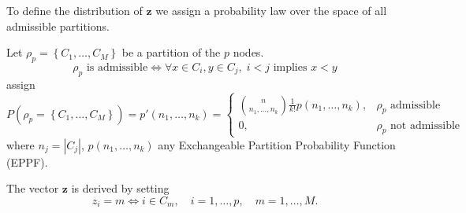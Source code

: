 \begin{frame}
To define the distribution of $\bm{z}$ we assign a probability law over the space of all \alert{admissible} partitions.

\pause

Let $\rho_p=\left\{C_1, \ldots, C_M\right\}$ be a partition of the $p$ nodes.
\[
    \rho_p \text{ is admissible} \iff \forall x \in C_i, y \in C_{j}, \; i<j \text{ implies } x < y
\]
\cite{martinezNonparametricChangePoint2014} assign
\begin{equation*}
    P\left(\rho_p=\left\{C_1, \ldots, C_M\right\}\right)
    =
    p'(n_1, \ldots, n_k)=
    \begin{cases}
        \binom{n}{n_1, \ldots, n_k} \frac{1}{k !} p(n_1, \ldots, n_k), & \rho_p \text{ admissible}\\
        0, & \rho_p \text{ not admissible}
    \end{cases}
\end{equation*}
where $n_j=\left|C_j\right|$, $p(n_1, \ldots, n_k)$ any Exchangeable Partition Probability Function (EPPF).

The vector $\bm{z}$ is derived by setting
\[
z_i=m \iff i \in C_m, \quad i=1, \ldots, p, \quad m=1, \ldots, M.
\]
\end{frame}







